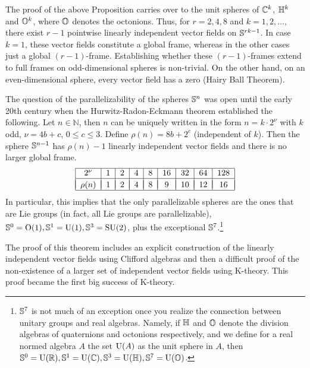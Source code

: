 \begin{rem}
    The proof of the above Proposition carries over to the unit spheres of $\mathbb{C}^k$, $\mathbb{H}^k$ and $\mathbb{O}^k$, where $\mathbb{O}$ denotes the octonions. Thus, for $r=2,4,8$ and $k=1,2,\ldots$, there exist $r-1$ pointwise linearly independent vector fields on $\mathbb{S}^{rk-1}$. In case $k=1$, these vector fields constitute a global frame, whereas in the other cases just a global $(r-1)$-frame. Establishing whether these $(r-1)$-frames extend to full frames on odd-dimensional spheres is non-trivial. On the other hand, on an even-dimensional sphere, every vector field has a zero (Hairy Ball Theorem).

    The question of the parallelizability of the spheres $\mathbb{S}^n$ was open until the early 20th century when the Hurwitz-Radon-Eckmann theorem established the following. Let $n\in\mathbb{N}$, then $n$ can be uniquely written in the form $n=k\cdot 2^\nu$ with $k$ odd, $\nu=4b+c$, $0\leq c\leq 3$. Define $\rho(n)=8b+2^c$ (independent of $k$). Then the sphere $\mathbb{S}^{n-1}$ has $\rho(n)-1$ linearly independent vector fields and there is no larger global frame. 
    \[\begin{tabular}{|c|c|c|c|c|c|c|c|c|}
    \hline 
    $2^\nu$ & 1 & 2 & 4 & 8 & 16 & 32 & 64 & 128\tabularnewline
    \hline &&&&&&&&\\[-1em]
    $\rho(n)$ &1 & 2 & 4 & 8 & 9 & 10 & 12 & 16\tabularnewline
    \hline 
    \end{tabular}\]
    In particular, this implies that the only parallelizable spheres are the ones that are Lie groups (in fact, all Lie groups are parallelizable), $\mathbb{S}^0=\rm{O}(1),\mathbb{S}^1=\rm{U}(1),\mathbb{S}^3=\rm{SU}(2)$, plus the exceptional $\mathbb{S}^7$.\footnote{$\mathbb{S}^7$ is not much of an exception once you realize the connection between unitary groups and real algebras. Namely, if $\mathbb{H} $ and $\mathbb{O}$ denote the division algebras of quaternions and octonions respectively, and we define for a real normed algebra $A$ the set ${\rm U}(A)$ as the unit sphere in $A$, then $\mathbb{S}^0=\rm{U}(\mathbb{R} ),\mathbb{S}^1=\rm{U}(\mathbb{C}),\mathbb{S}^3=\rm{U}(\mathbb{H}),\mathbb{S}^7=\rm{U}(\mathbb{O})$.}
    
    The proof of this theorem includes an explicit construction of the linearly independent vector fields using Clifford algebras and then a difficult proof of the non-existence of a larger set of independent vector fields using K-theory. This proof became the first big success of K-theory.
\end{rem}



